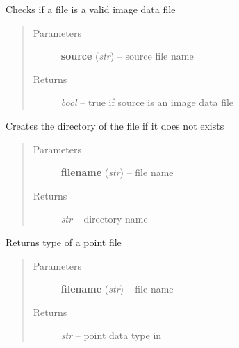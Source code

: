 \documentclass[letterpaper,10pt,english]{sphinxmanual}
\begin{document}

\begin{fulllineitems}
\label{api/ClearMap.IO:ClearMap.IO.IO.isDataFile}
Checks if a file is a valid image data file
\begin{quote}\begin{description}
\item[{Parameters}] \leavevmode
\textbf{source} (\emph{str}) --
source file name

\item[{Returns}] \leavevmode
\emph{bool} --
true if source is an image data file

\end{description}\end{quote}

\end{fulllineitems}


\begin{fulllineitems}
\label{api/ClearMap.IO:ClearMap.IO.IO.createDirectory}
Creates the directory of the file if it does not exists
\begin{quote}\begin{description}
\item[{Parameters}] \leavevmode
\textbf{filename} (\emph{str}) --
file name

\item[{Returns}] \leavevmode
\emph{str} --
directory name

\end{description}\end{quote}

\end{fulllineitems}


\begin{fulllineitems}
\label{api/ClearMap.IO:ClearMap.IO.IO.pointFileNameToType}
Returns type of a point file
\begin{quote}\begin{description}
\item[{Parameters}] \leavevmode
\textbf{filename} (\emph{str}) --
file name

\item[{Returns}] \leavevmode
\emph{str} --
point data type in {\hyperref[api/ClearMap.IO:ClearMap.IO.IO.pointFileTypes]{\emph{}}}

\end{description}\end{quote}

\end{fulllineitems}
\end{document}
